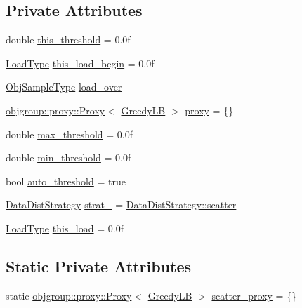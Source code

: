 \subsection*{Private Attributes}
\begin{DoxyCompactItemize}
\item 
double \hyperlink{structvt_1_1vrt_1_1collection_1_1lb_1_1_greedy_l_b_afd457b0829f152767e1aa5b07d7652ef}{this\+\_\+threshold} = 0.\+0f
\item 
\hyperlink{namespacevt_a8fb51741340b87d7aaee0bef60e9896b}{Load\+Type} \hyperlink{structvt_1_1vrt_1_1collection_1_1lb_1_1_greedy_l_b_a95beecba794f8ac758242f1507a6d0ab}{this\+\_\+load\+\_\+begin} = 0.\+0f
\item 
\hyperlink{structvt_1_1vrt_1_1collection_1_1lb_1_1_load_sampler_base_l_b_a8d939a849ec0d6371c1c4d441ffb9b94}{Obj\+Sample\+Type} \hyperlink{structvt_1_1vrt_1_1collection_1_1lb_1_1_greedy_l_b_ae2701a450913d33bf8767164976b6e4c}{load\+\_\+over}
\item 
\hyperlink{structvt_1_1objgroup_1_1proxy_1_1_proxy}{objgroup\+::proxy\+::\+Proxy}$<$ \hyperlink{structvt_1_1vrt_1_1collection_1_1lb_1_1_greedy_l_b}{Greedy\+LB} $>$ \hyperlink{structvt_1_1vrt_1_1collection_1_1lb_1_1_greedy_l_b_ac121b6c8cafc463423b0ce7bdfb43806}{proxy} = \{\}
\item 
double \hyperlink{structvt_1_1vrt_1_1collection_1_1lb_1_1_greedy_l_b_a3134b75d2fd3ff63faa6a41b4c7b3dae}{max\+\_\+threshold} = 0.\+0f
\item 
double \hyperlink{structvt_1_1vrt_1_1collection_1_1lb_1_1_greedy_l_b_ae3d436ffc085fb846a1970018c593985}{min\+\_\+threshold} = 0.\+0f
\item 
bool \hyperlink{structvt_1_1vrt_1_1collection_1_1lb_1_1_greedy_l_b_a480ec7c5fa24215d70d34901f0549ff0}{auto\+\_\+threshold} = true
\item 
\hyperlink{namespacevt_1_1vrt_1_1collection_1_1lb_a0c49bf89a59ba0fd5160bc3894417dfa}{Data\+Dist\+Strategy} \hyperlink{structvt_1_1vrt_1_1collection_1_1lb_1_1_greedy_l_b_a41cd413b052ad6fb98fea034472fe31f}{strat\+\_\+} = \hyperlink{namespacevt_1_1vrt_1_1collection_1_1lb_a0c49bf89a59ba0fd5160bc3894417dfaa50894a237d9bcde0a18769af9a768baf}{Data\+Dist\+Strategy\+::scatter}
\item 
\hyperlink{namespacevt_a8fb51741340b87d7aaee0bef60e9896b}{Load\+Type} \hyperlink{structvt_1_1vrt_1_1collection_1_1lb_1_1_greedy_l_b_ab63d0de2d5e6c22d2a0c5e6c627a4949}{this\+\_\+load} = 0.\+0f
\end{DoxyCompactItemize}
\subsection*{Static Private Attributes}
\begin{DoxyCompactItemize}
\item 
static \hyperlink{structvt_1_1objgroup_1_1proxy_1_1_proxy}{objgroup\+::proxy\+::\+Proxy}$<$ \hyperlink{structvt_1_1vrt_1_1collection_1_1lb_1_1_greedy_l_b}{Greedy\+LB} $>$ \hyperlink{structvt_1_1vrt_1_1collection_1_1lb_1_1_greedy_l_b_a6be0a6b993320f141d5f94867511abfb}{scatter\+\_\+proxy} = \{\}
\end{DoxyCompactItemize}
